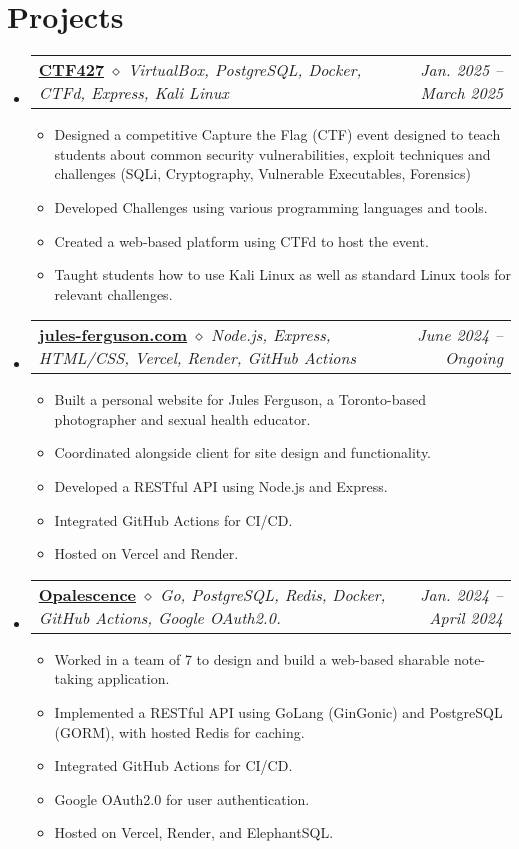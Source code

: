 \documentclass[letterpaper,11pt]{article}
\makeatletter
\newcommand{\resumeItem}[1]{
  \item\small{
    {#1 \vspace{-2pt}}
  }
}
\newcommand{\resumeProjectHeading}[2]{
    \item
    \begin{tabular*}{0.97\textwidth}{l@{\extracolsep{\fill}}r}
      \small#1 & #2 \\
    \end{tabular*}\vspace{-7pt}
}
\newcommand{\resumeSubHeadingListStart}{\begin{itemize}[leftmargin=0.15in, label={}]}
\newcommand{\resumeSubHeadingListEnd}{\end{itemize}}
\newcommand{\resumeItemListStart}{\begin{itemize}}
\newcommand{\resumeItemListEnd}{\end{itemize}\vspace{-5pt}}
\makeatother
\begin{document}
\section{Projects}
    \resumeSubHeadingListStart
      \resumeProjectHeading
      {\textbf{\href{https://github.com/marceloponceardon/CTF427}{CTF427}} $\diamond$ \emph{VirtualBox, PostgreSQL, Docker, CTFd, Express, Kali Linux}}{\emph{Jan. 2025 -- March 2025}}
          \resumeItemListStart
	  \resumeItem{Designed a competitive Capture the Flag (CTF) event designed to teach students about common security vulnerabilities, exploit techniques and challenges (SQLi, Cryptography, Vulnerable Executables, Forensics)}
	  \resumeItem{Developed Challenges using various programming languages and tools.}
	  \resumeItem{Created a web-based platform using CTFd to host the event.}
	  \resumeItem{Taught students how to use Kali Linux as well as standard Linux tools for relevant challenges.}
          \resumeItemListEnd
      \resumeProjectHeading
      {\textbf{\href{https://github.com/marceloponceardon/jules-ferguson.com}{jules-ferguson.com}} $\diamond$ \emph{Node.js, Express, HTML/CSS, Vercel, Render, GitHub Actions} }{\emph{June 2024 -- Ongoing}}
	  \resumeItemListStart
	  \resumeItem{Built a personal website for Jules Ferguson, a Toronto-based photographer and sexual health educator.}
	  \resumeItem{Coordinated alongside client for site design and functionality.}
	  \resumeItem{Developed a RESTful API using Node.js and Express.}
	  \resumeItem{Integrated GitHub Actions for CI/CD.}
	  \resumeItem{Hosted on Vercel and Render.}
	  \resumeItemListEnd
      \resumeProjectHeading
      {\textbf{\href{https://github.com/opalescencelabs}{Opalescence}} $\diamond$ \emph{Go, PostgreSQL, Redis, Docker, GitHub Actions, Google OAuth2.0.}}{\emph{Jan. 2024 -- April 2024}}
          \resumeItemListStart
	  \resumeItem{Worked in a team of 7 to design and build a web-based sharable note-taking application.}
	  \resumeItem{Implemented a RESTful API using GoLang (GinGonic) and PostgreSQL (GORM), with hosted Redis for caching.}
	  \resumeItem{Integrated GitHub Actions for CI/CD.}
	  \resumeItem{Google OAuth2.0 for user authentication.}
	  \resumeItem{Hosted on Vercel, Render, and ElephantSQL.}
          \resumeItemListEnd
    \resumeSubHeadingListEnd

%
\end{document}
